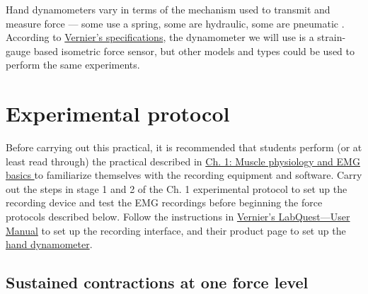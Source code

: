 \documentclass{article}
\begin{document}
Hand dynamometers vary in terms of the mechanism used to transmit and measure force --- some use a spring, some are hydraulic, some are pneumatic \citep{bergeron2024pressure}. According to \href{https://www.vernier.com/manuals/hd-bta/}{Vernier's specifications}, the dynamometer we will use is a strain-gauge based isometric force sensor, but other models and types could be used to perform the same experiments.

\section{Experimental protocol}

Before carrying out this practical, it is recommended that students perform (or at least read through) the practical described in \href{https://curvenote.com/oxa:EPpXta8zJdzN048lz8AR/hZTnTYzQR5EQmCKX51Wj}{Ch. 1: Muscle physiology and EMG basics }to familiarize themselves with the recording equipment and software. Carry out the steps in stage 1 and 2 of the Ch. 1 experimental protocol to set up the recording device and test the EMG recordings before beginning the force protocols described below. Follow the instructions in \href{http://www2.vernier.com/manuals/labquest2\_user\_manual.pdf}{Vernier's LabQuest---User Manual} to set up the recording interface, and their product page to set up the \href{https://www.vernier.com/manuals/hd-bta/}{hand dynamometer}.

\subsection{Sustained contractions at one force level}
\end{document}
